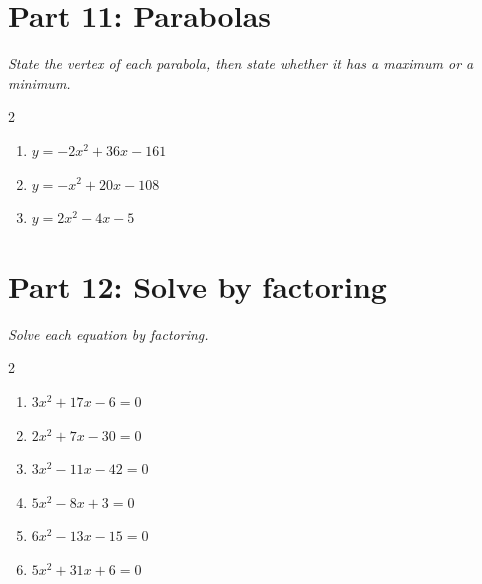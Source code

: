 \documentclass[11pt]{article}
\begin{document}
\section*{Part 11: Parabolas}
\noindent\textit{State the vertex of each parabola, then state whether it has a maximum or a minimum.}
\begin{multicols}{2}
\begin{enumerate}
  \item $y = -2x^{2} + 36x - 161$
  \vspace{1.8cm}
  \item $y = -x^{2} + 20x - 108$
  \vspace{1.8cm}
  \item $y = 2x^{2} - 4x - 5$
  \vspace{1.8cm}
\end{enumerate}
\end{multicols}

\section*{Part 12: Solve by factoring}
\noindent\textit{Solve each equation by factoring.}
\begin{multicols}{2}
\begin{enumerate}
  \item $3x^{2} + 17x - 6 = 0$
  \vspace{2.4cm}
  \item $2x^{2} + 7x - 30 = 0$
  \vspace{2.4cm}
  \item $3x^{2} - 11x - 42 = 0$
  \vspace{2.4cm}
  \item $5x^{2} - 8x + 3 = 0$
  \vspace{2.4cm}
  \item $6x^{2} - 13x - 15 = 0$
  \vspace{2.4cm}
  \item $5x^{2} + 31x + 6 = 0$
  \vspace{2.4cm}
\end{enumerate}
\end{multicols}
\end{document}
